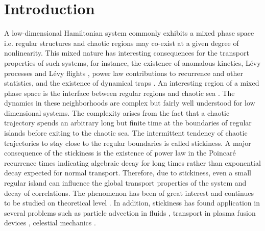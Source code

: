 \documentclass[reprint,amsmath,amssymb,aps,pre]{revtex4-1}
\begin{document}
\section{Introduction} 
A low-dimensional Hamiltonian system commonly exhibits a mixed phase space 
i.e. regular structures and chaotic regions may co-exist at a given degree of 
nonlinearity. This mixed nature has interesting consequences for the transport
properties of such systems, for instance, the existence of anomalous kinetics,
L\'{e}vy processes and L\'{e}vy flights \cite{Klafter1994,Zaburdaev2015}, 
power law contributions to recurrence and other statistics, and the existence 
of dynamical traps \cite{Zaslavsky2002a,Zaslavsky2002b}. An interesting region 
of a mixed phase space is the interface between regular regions and chaotic 
sea \cite{Mackay1984, Easton1993}. The dynamics in these neighborhoods are 
complex but fairly well understood \cite{Meiss2015} for low dimensional 
systems. The complexity arises from the fact that a chaotic trajectory spends 
an arbitrary long but finite time at the boundaries of regular islands before 
exiting to the chaotic sea. The intermittent tendency of chaotic trajectories 
to stay close to the regular boundaries is called stickiness. A major 
consequence of the stickiness is  the existence of power law in the 
Poincar{\'e} recurrence times indicating algebraic decay for long 
times rather than exponential decay expected for normal transport. 
Therefore, due to stickiness, even a small regular island can influence the 
global transport properties of the system and decay of correlations. The 
phenomenon has been of great interest and continues to be studied on 
theoretical level \cite{Altmann2006, Altmann2010,Livorati2012,Bunimovich2012, 
Kruger2015, Lange2016}. In addition, stickiness has found application in 
several problems such as particle advection in fluids 
\cite{Babiano1994,Tel2005}, transport in 
plasma fusion devices \cite{Szezech2012,Martins2014}, celestial mechanics 
\cite{Efthymiopoulos1999, Harsoula2010, Harsoula2016}.
\end{document}
